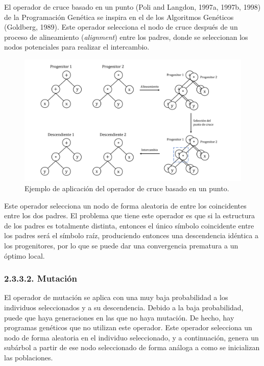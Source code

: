 \documentclass[spanish,a4paper,12pt,twoside]{report}
\begin{document}
        \subsubsection*{\vspace{-0.5cm}{\normalsize Operador basado en un punto}}
        \vspace{-0.5cm}
        El operador de cruce basado en un punto (Poli and Langdon, 1997a, 1997b, 1998) de la Programación Genética se inspira en el de los Algoritmos Genéticos (Goldberg, 1989). Este operador selecciona el nodo de cruce después de un proceso de alineamiento (\emph{alignment}) entre los padres, donde se seleccionan los nodos potenciales para realizar el intercambio.
        \begin{figure}[H]
          \centering
          \includegraphics[width = 1\textwidth]{resources/Fig4.pdf}
          \caption{Ejemplo de aplicación del operador de cruce basado en un punto.}
          \label{fig:4}
        \end{figure} \par
        Este operador selecciona un nodo de forma aleatoria de entre los coincidentes entre los dos padres. El problema que tiene este operador es que si la estructura de los padres es totalmente distinta, entonces el único símbolo coincidente entre los padres será el símbolo raíz, produciendo entonces una descendencia idéntica a los progenitores, por lo que se puede dar una convergencia prematura a un óptimo local.
        
      \subsubsection*{\normalsize 2.3.3.2. Mutación}
      El operador de mutación se aplica con una muy baja probabilidad a los individuos seleccionados y a su descendencia. Debido a la baja probabilidad, puede que haya generaciones en las que no haya mutación. De hecho, hay programas genéticos que no utilizan este operador. Este operador selecciona un nodo de forma aleatoria en el individuo seleccionado, y a continuación, genera un subárbol a partir de ese nodo seleccionado de forma análoga a como se inicializan las poblaciones.
\end{document}
